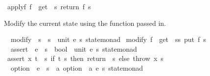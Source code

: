 \begin{isabellebody}
\ {\isachardoublequoteopen}applyf\ f\ {\isacharequal}{\kern0pt}\ get\ {\isasymbind}\ {\isacharparenleft}{\kern0pt}{\isasymlambda}s{\isachardot}{\kern0pt}\ return\ {\isacharparenleft}{\kern0pt}f\ s{\isacharparenright}{\kern0pt}{\isacharparenright}{\kern0pt}{\isachardoublequoteclose}%
\begin{isamarkuptext}%
Modify the current state using the function passed in.%
\end{isamarkuptext}\isamarkuptrue%
\isamarkupfalse%
\isanewline
\ \ modify\ {\isacharcolon}{\kern0pt}{\isacharcolon}{\kern0pt}\ {\isachardoublequoteopen}{\isacharparenleft}{\kern0pt}{\isacharprime}{\kern0pt}s\ {\isasymRightarrow}\ {\isacharprime}{\kern0pt}s{\isacharparenright}{\kern0pt}\ {\isasymRightarrow}\ {\isacharparenleft}{\kern0pt}unit{\isacharcomma}{\kern0pt}\ {\isacharprime}{\kern0pt}e{\isacharcomma}{\kern0pt}\ {\isacharprime}{\kern0pt}s{\isacharparenright}{\kern0pt}\ state{\isacharunderscore}{\kern0pt}monad{\isachardoublequoteclose}\isanewline
{}\ {\isachardoublequoteopen}modify\ f\ {\isacharequal}{\kern0pt}\ get\ {\isasymbind}\ {\isacharparenleft}{\kern0pt}{\isasymlambda}s{\isacharcolon}{\kern0pt}{\isacharcolon}{\kern0pt}{\isacharprime}{\kern0pt}s{\isachardot}{\kern0pt}\ put\ {\isacharparenleft}{\kern0pt}f\ s{\isacharparenright}{\kern0pt}{\isacharparenright}{\kern0pt}{\isachardoublequoteclose}\isanewline
\isanewline
{}\isamarkupfalse%
\isanewline
\ \ assert\ {\isacharcolon}{\kern0pt}{\isacharcolon}{\kern0pt}\ {\isachardoublequoteopen}{\isacharprime}{\kern0pt}e\ {\isasymRightarrow}\ {\isacharparenleft}{\kern0pt}{\isacharprime}{\kern0pt}s\ {\isasymRightarrow}\ bool{\isacharparenright}{\kern0pt}\ {\isasymRightarrow}\ {\isacharparenleft}{\kern0pt}unit{\isacharcomma}{\kern0pt}\ {\isacharprime}{\kern0pt}e{\isacharcomma}{\kern0pt}\ {\isacharprime}{\kern0pt}s{\isacharparenright}{\kern0pt}\ state{\isacharunderscore}{\kern0pt}monad{\isachardoublequoteclose}\ \isanewline
\ {\isachardoublequoteopen}assert\ x\ t\ {\isacharequal}{\kern0pt}\ {\isacharparenleft}{\kern0pt}{\isasymlambda}s{\isachardot}{\kern0pt}\ if\ {\isacharparenleft}{\kern0pt}t\ s{\isacharparenright}{\kern0pt}\ then\ return\ {\isacharparenleft}{\kern0pt}{\isacharparenright}{\kern0pt}\ s\ else\ throw\ x\ s{\isacharparenright}{\kern0pt}{\isachardoublequoteclose}\isanewline
\isanewline
{}\isamarkupfalse%
\isanewline
\ \ option\ {\isacharcolon}{\kern0pt}{\isacharcolon}{\kern0pt}\ {\isachardoublequoteopen}{\isacharprime}{\kern0pt}e\ {\isasymRightarrow}\ {\isacharparenleft}{\kern0pt}{\isacharprime}{\kern0pt}s\ {\isasymRightarrow}\ {\isacharprime}{\kern0pt}a\ option{\isacharparenright}{\kern0pt}\ {\isasymRightarrow}\ {\isacharparenleft}{\kern0pt}{\isacharprime}{\kern0pt}a{\isacharcomma}{\kern0pt}\ {\isacharprime}{\kern0pt}e{\isacharcomma}{\kern0pt}\ {\isacharprime}{\kern0pt}s{\isacharparenright}{\kern0pt}\ state{\isacharunderscore}{\kern0pt}monad{\isachardoublequoteclose}\ \isanewline

\end{isabellebody}
